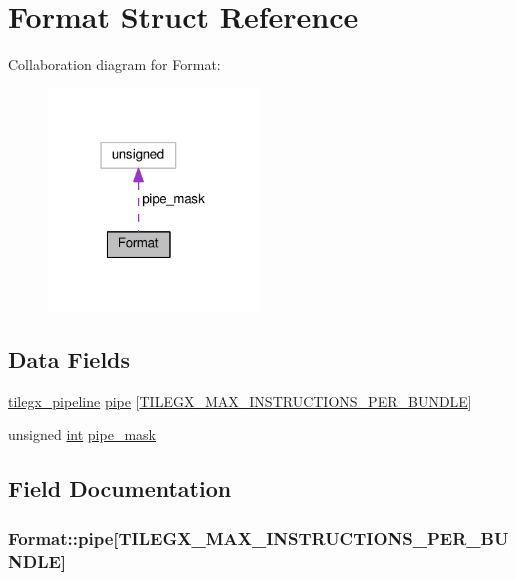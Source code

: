 \hypertarget{structFormat}{}\section{Format Struct Reference}
\label{structFormat}


Collaboration diagram for Format\+:
\nopagebreak
\begin{figure}[H]
\begin{center}
\leavevmode
\includegraphics[width=159pt]{structFormat__coll__graph}
\end{center}
\end{figure}
\subsection*{Data Fields}
\begin{DoxyCompactItemize}
\item 
\hyperlink{sljitNativeTILEGX-encoder_8c_aa029f8472226bf02a6aac4947f869f6e}{tilegx\+\_\+pipeline} \hyperlink{structFormat_a3effbc3ccf12ed774f5e90aedfde075d}{pipe} \mbox{[}\hyperlink{sljitNativeTILEGX-encoder_8c_a56a0f36da7f9eaaf54bd05cc2bf49173a5f18df73b02f954ca56393f4d40725c1}{T\+I\+L\+E\+G\+X\+\_\+\+M\+A\+X\+\_\+\+I\+N\+S\+T\+R\+U\+C\+T\+I\+O\+N\+S\+\_\+\+P\+E\+R\+\_\+\+B\+U\+N\+D\+LE}\mbox{]}
\item 
unsigned \hyperlink{pcre_8txt_a42dfa4ff673c82d8efe7144098fbc198}{int} \hyperlink{structFormat_a1a8686c9c4d6960eee50abae997e1a2a}{pipe\+\_\+mask}
\end{DoxyCompactItemize}


\subsection{Field Documentation}
\subsubsection[{\texorpdfstring{pipe}{pipe}}]{ Format\+::pipe\mbox{[}{\bf T\+I\+L\+E\+G\+X\+\_\+\+M\+A\+X\+\_\+\+I\+N\+S\+T\+R\+U\+C\+T\+I\+O\+N\+S\+\_\+\+P\+E\+R\+\_\+\+B\+U\+N\+D\+LE}\mbox{]}}\hypertarget{structFormat_a3effbc3ccf12ed774f5e90aedfde075d}{}\label{structFormat_a3effbc3ccf12ed774f5e90aedfde075d}
